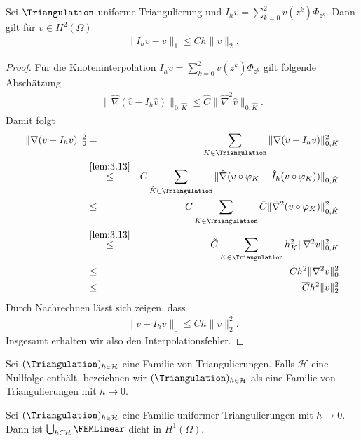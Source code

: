 \begin{Satz}
    \label{satz:3.17}
    Sei $\Triangulation$ uniforme Triangulierung und $I_h v = \sum_{k=0}^2 v(z^k)
    \Phi_{z^k}$. Dann gilt für $v\in H^2(\Omega)$
    \begin{eqnarray*}
        \|I_h v - v\|_1 \le C h \|v\|_2.
    \end{eqnarray*}
\end{Satz}


\begin{proof}
    Für die Knoteninterpolation $I_h v = \sum_{k=0}^2 v(z^k) \Phi_{z^k}$ gilt
    folgende Abschätzung
    \begin{eqnarray*}
            \|\hat\nabla (\hat v - I_h \hat v)\|_{0,\hat K}
        \le \hat C \|\hat\nabla^2 \hat v\|_{0,\hat K}.
    \end{eqnarray*}
    Damit folgt
    \begin{eqnarray*}
            \|\nabla (v - I_h v)\|_0^2
        &=& \sum_{K\in\Triangulation} \|\nabla (v - I_h v)\|_{0,K}^2 \\
        &\stackrel{\eqref{lem:3.13}}{\le}& C \sum_{\hat K\in\Triangulation}
              \|\hat\nabla (v \circ \varphi_K
              - \hat I_h (v \circ \varphi_K))\|_{0,\hat K} \\
        &\le& C \sum_{\hat K\in\Triangulation} \hat C
              \|\hat \nabla^2 (v \circ \varphi_K)\|_{0,\hat K}^2 \\
        &\stackrel{\eqref{lem:3.13}}{\le}& \tilde C
              \sum_{K\in\Triangulation} h_K^2 \|\nabla^2 v\|_{0,K}^2 \\
        &\le& \tilde C h^2 \|\nabla^2 v\|_0^2 \\
        &\le& \overline C h^2 \|v\|_2^2
    \end{eqnarray*}
    Durch Nachrechnen lässt sich zeigen, dass
    \begin{eqnarray*}
            \|v - I_h v\|_0
        \le C h \|v\|_2^2.
    \end{eqnarray*}
    Insgesamt erhalten wir also den Interpolationsfehler.
\end{proof}

\begin{Bemerkung}
    Sei $(\Triangulation)_{h\in\mathcal{H}}$ eine Familie von Triangulierungen. Falls $\mathcal{H}$ eine Nullfolge enthält, bezeichnen wir $(\Triangulation)_{h\in\mathcal{H}}$ als eine Familie von Triangulierungen mit $h \to 0$.
\end{Bemerkung}


\begin{Folgerung}
    \label{folgerung:3.18}
    Sei $(\Triangulation)_{h\in\mathcal{H}}$ eine Familie uniformer
    Triangulierungen mit $h \to 0$. Dann ist $\bigcup_{h\in \mathcal{H}}
    \FEMLinear$ dicht in $H^1(\Omega)$.
\end{Folgerung}


